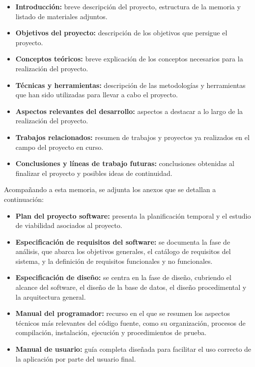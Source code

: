 \begin{itemize}
\tightlist
\item
  \textbf{Introducción:} breve descripción del proyecto, estructura de la memoria y listado de materiales adjuntos.
\item
  \textbf{Objetivos del proyecto:} descripción de los objetivos que persigue el proyecto.
\item
  \textbf{Conceptos teóricos:} breve explicación de los conceptos necesarios para la realización del proyecto.
\item
  \textbf{Técnicas y herramientas:} descripción de las metodologías y herramientas que han sido utilizadas para llevar a cabo el proyecto.
\item
  \textbf{Aspectos relevantes del desarrollo:} aspectos a destacar a lo largo de la realización del proyecto.
\item
  \textbf{Trabajos relacionados:} resumen de trabajos y proyectos ya realizados en el campo del proyecto en curso.
\item
  \textbf{Conclusiones y líneas de trabajo futuras:} conclusiones obtenidas al finalizar el proyecto y posibles ideas de continuidad.
\end{itemize}

Acompañando a esta memoria, se adjunta los anexos que se detallan a continuación:

\begin{itemize}
\tightlist
\item
  \textbf{Plan del proyecto software:} presenta la planificación temporal y el estudio de viabilidad asociados al proyecto.
\item
  \textbf{Especificación de requisitos del software:} se documenta la fase de análisis, que abarca los objetivos generales, el catálogo de requisitos del sistema, y la definición de requisitos funcionales y no funcionales.
\item
  \textbf{Especificación de diseño:} se centra en la fase de diseño, cubriendo el alcance del software, el diseño de la base de datos, el diseño procedimental y la arquitectura general.
\item
  \textbf{Manual del programador:} recurso en el que se resumen los aspectos técnicos más relevantes del código fuente, como su organización, procesos de compilación, instalación, ejecución y procedimientos de prueba.
\item
  \textbf{Manual de usuario:} guía completa diseñada para facilitar el uso correcto de la aplicación por parte del usuario final.
\end{itemize}

